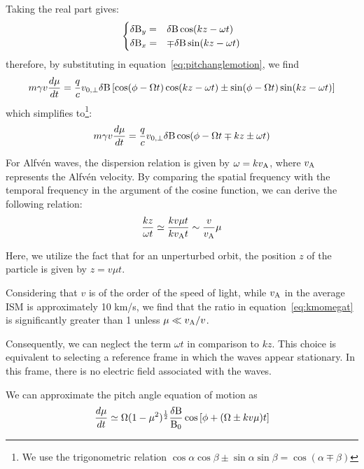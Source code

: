 Taking the real part gives:
%
\begin{equation}
\begin{cases}\delta {\rm B}_y = & \delta {\rm B} \cos (kz - \omega t) \\
\delta {\rm B}_x = & \mp\delta {\rm B} \sin (kz - \omega t) 
\end{cases}
\end{equation}
%
therefore, by substituting in equation~\eqref{eq:pitchanglemotion}, we find
%
\begin{equation}
m\gamma v \frac{d\mu}{dt} = 
\frac{q}{c}v_{0,\perp} \delta{\rm B} \left[\cos(\phi-\Omega t) \cos (kz - \omega t) \pm \sin(\phi - \Omega t) \sin (kz - \omega t)\right]
\end{equation}
%
which simplifies to\footnote{We use the trigonometric relation $\cos \alpha \cos \beta \pm \sin \alpha \sin \beta = \cos (\alpha \mp \beta)$}:
%
\begin{equation}
m\gamma v \frac{d\mu}{dt} = 
\frac{q}{c}v_{0,\perp} \delta {\rm B} \cos(\phi-\Omega t \mp kz \pm \omega t)
\end{equation}

For Alfvén waves, the dispersion relation is given by $\omega = k v_{\rm A}$, where $v_{\rm A}$ represents the Alfvén velocity. By comparing the spatial frequency with the temporal frequency in the argument of the cosine function, we can derive the following relation:
%
\begin{equation}
\frac{kz}{\omega t} \simeq \frac{k v \mu t}{k v_{\rm A} t} \sim \frac{v}{v_{\rm A}} \mu
\label{eq:kmomegat}
\end{equation}

Here, we utilize the fact that for an unperturbed orbit, the position $z$ of the particle is given by $z = v \mu t$.

Considering that $v$ is of the order of the speed of light, while $v_{\rm A}$ in the average ISM is approximately 10 km/s, we find that the ratio in equation~\eqref{eq:kmomegat} is significantly greater than 1 unless $\mu \ll v_{\rm A} / v$.

Consequently, we can neglect the term $\omega t$ in comparison to $kz$. This choice is equivalent to selecting a reference frame in which the waves appear stationary. In this frame, there is no electric field associated with the waves.

We can approximate the pitch angle equation of motion as
%
\begin{equation}
\frac{d\mu}{dt} \simeq \Omega
(1-\mu^2)^{\frac 1 2} \frac{\delta {\rm B}}{{\rm B}_0} \cos\left[\phi + (\Omega \pm k v \mu) t \right]
\end{equation}

